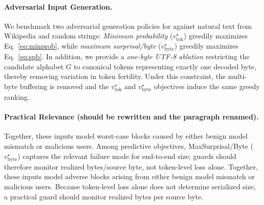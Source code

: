 \documentclass{article}
\newcommand{\vtok}{v^\star_{\mathrm{tok}}}
\newcommand{\vbyte}{v^\star_{\mathrm{byte}}}
\begin{document}
\paragraph{Adversarial Input Generation.}
We benchmark two adversarial generation policies for against natural text from Wikipedia and random strings:
\emph{Minimum probability} ($\vtok$) greedily maximizes Eq.~\ref{eq:minprob}, while \emph{maximum surprisal/byte} ($\vbyte$)
greedily maximizes Eq.~\ref{eq:spb}. In addition, we provide a \emph{one-byte UTF-8 ablation} restricting the candidate alphabet $G$ to
canonical tokens representing exactly one decoded byte, thereby removing variation in token fertility.
Under this constraint, the multi-byte buffering is removed and the $\vtok$ and $\vbyte$ objectives induce
the same greedy ranking. %

\paragraph{Practical Relevance (should be rewritten and the paragraph renamed).}
Together, these inputs model worst-case blocks caused by either benign model mismatch or malicious
users. Among predictive objectives, MaxSurprisal/Byte ($\vbyte$) captures the relevant
failure mode for end-to-end size; guards should therefore monitor realized bytes/source byte, not token-level loss alone.
Together, these inputs model adverse blocks arising from either benign model mismatch or
malicious users. Because token-level loss alone does not determine serialized
size, a practical guard should monitor realized bytes per source byte.





\end{document}
